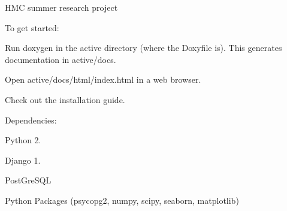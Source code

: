 H\+MC summer research project

To get started\+:
\begin{DoxyEnumerate}
\item Run {\ttfamily doxygen} in the {\ttfamily active} directory (where the {\ttfamily Doxyfile} is). This generates documentation in {\ttfamily active/docs}.
\end{DoxyEnumerate}
\begin{DoxyEnumerate}
\item Open {\ttfamily active/docs/html/index.\+html} in a web browser.
\end{DoxyEnumerate}
\begin{DoxyEnumerate}
\item Check out the installation guide.
\end{DoxyEnumerate}

Dependencies\+:
\begin{DoxyItemize}
\item Python 2.
\item Django 1.
\item Post\+Gre\+S\+QL
\item Python Packages (psycopg2, numpy, scipy, seaborn, matplotlib) 
\end{DoxyItemize}